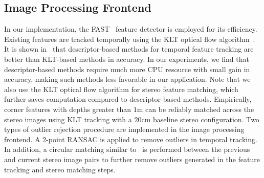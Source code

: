 \subsection{Image Processing Frontend}
\label{subsec: image processing frontend}
In our implementation, the FAST~\cite{trajkovic1998fast} feature detector is employed for its efficiency. Existing features are tracked temporally using the KLT optical flow algorithm~\cite{lucas1981iterative}. It is shown in~\cite{paulcomparative} that descriptor-based methods for temporal feature tracking are better than KLT-based methods in accuracy. In our experiments, we find that descriptor-based methods require much more CPU resource with small gain in accuracy, making such methods less favorable in our application. Note that we also use the KLT optical flow algorithm for stereo feature matching, which further saves computation compared to descriptor-based methods. Empirically, corner features with depths greater than $1$m can be reliably matched across the stereo images using KLT tracking with a $20$cm baseline stereo configuration. Two types of outlier rejection procedure are implemented in the image processing frontend. A 2-point RANSAC is applied to remove outliers in temporal tracking. In addition, a circular matching similar to~\cite{kitt2010visual} is performed between the previous and current stereo image pairs to further remove outliers generated in the feature tracking and stereo matching steps.